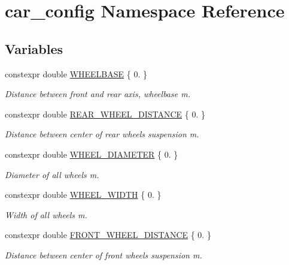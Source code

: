 \hypertarget{namespacecar__config}{}\section{car\+\_\+config Namespace Reference}
\label{namespacecar__config}
\subsection*{Variables}
\begin{DoxyCompactItemize}
\item 
constexpr double \hyperlink{namespacecar__config_a4e9e4925d43a88de91b13bedafabce67}{W\+H\+E\+E\+L\+B\+A\+SE} \{ 0. \}
\begin{DoxyCompactList}\small\item\em Distance between front and rear axis, wheelbase  m. \end{DoxyCompactList}\item 
constexpr double \hyperlink{namespacecar__config_a43e668702c6dc662ff95f80047ee5500}{R\+E\+A\+R\+\_\+\+W\+H\+E\+E\+L\+\_\+\+D\+I\+S\+T\+A\+N\+CE} \{ 0. \}
\begin{DoxyCompactList}\small\item\em Distance between center of rear wheels suspension  m. \end{DoxyCompactList}\item 
constexpr double \hyperlink{namespacecar__config_a6f064e331d6d85d46028dfbe75f063dd}{W\+H\+E\+E\+L\+\_\+\+D\+I\+A\+M\+E\+T\+ER} \{ 0. \}
\begin{DoxyCompactList}\small\item\em Diameter of all wheels  m. \end{DoxyCompactList}\item 
constexpr double \hyperlink{namespacecar__config_ace29186cd9605cde6edd0fd9b814df63}{W\+H\+E\+E\+L\+\_\+\+W\+I\+D\+TH} \{ 0. \}
\begin{DoxyCompactList}\small\item\em Width of all wheels  m. \end{DoxyCompactList}\item 
constexpr double \hyperlink{namespacecar__config_a80d9d6f97a63ffcaba87b65a9e1e29e4}{F\+R\+O\+N\+T\+\_\+\+W\+H\+E\+E\+L\+\_\+\+D\+I\+S\+T\+A\+N\+CE} \{ 0. \}
\begin{DoxyCompactList}\small\item\em Distance between center of front wheels suspension  m. \end{DoxyCompactList}\item 

\end{DoxyCompactItemize}
